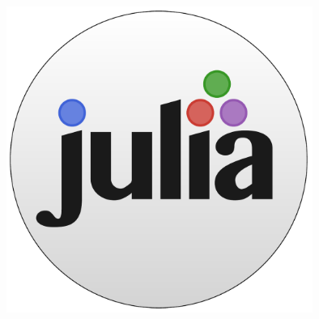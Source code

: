 \documentclass[a0,landscape]{a0poster}
\begin{document}
%
\begin{minipage}[b]{0.125\linewidth}
\includegraphics[width=10cm]{julia-logo-circular.pdf}\\
\end{minipage}

\vspace{1cm} %

\end{document}
